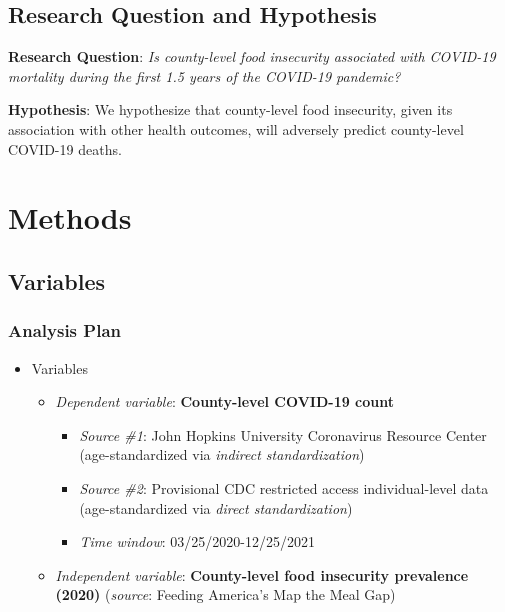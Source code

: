 \documentclass{beamer}
\begin{document}
\subsection{Research Question and Hypothesis}

\begin{frame}
	
	\begin{center}
		\textbf{Research Question}: \textit{Is county-level food insecurity associated with COVID-19 mortality during the first 1.5 years of the COVID-19 pandemic?}\\
		
		\vspace{1.5cm}
		
		\textbf{Hypothesis}: We hypothesize that county-level food insecurity, given its association with other health outcomes, will adversely predict county-level COVID-19 deaths.
	\end{center}
\end{frame}

 \section{Methods}
 \subsection{Variables}
\begin{frame}
	\frametitle{Analysis Plan}
\begin{itemize}
	\item Variables
	\begin{itemize}
		\item \textit{Dependent variable}: \textbf{County-level COVID-19 count}
		\begin{itemize}
			\item \textit{Source \#1}: John Hopkins University Coronavirus Resource Center (age-standardized via \textit{indirect standardization})
			\item \textit{Source \#2}: Provisional CDC restricted access individual-level data (age-standardized via \textit{direct standardization})
			\item \textit{Time window}: 03/25/2020-12/25/2021
		\end{itemize}
		\vspace{0.2cm}
		\item \textit{Independent variable}: \textbf{County-level food insecurity prevalence (2020)} (\textit{source}: Feeding America's Map the Meal Gap)
		\vspace{0.2cm}
		\vspace{0.2cm}
	\end{itemize}
\end{itemize}
\end{frame}
\end{document}
